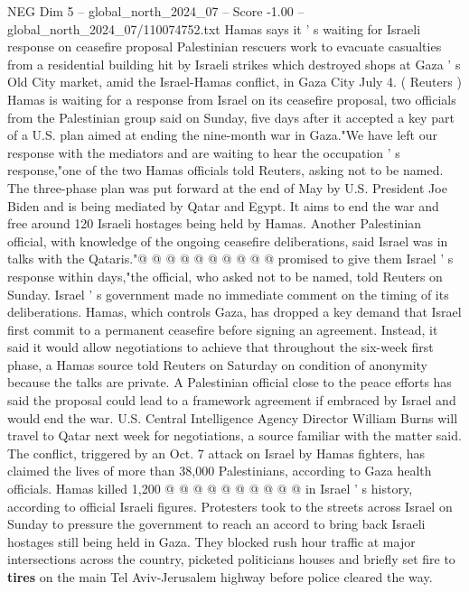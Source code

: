 \begin{textsample}{NEG Dim 5 – global\_north\_2024\_07 – Score -1.00 – global\_north\_2024\_07/110074752.txt}  \label{ex:f5_neg_156}
Hamas says it ' s waiting for Israeli response on ceasefire proposal Palestinian rescuers work to evacuate casualties from a residential building hit by Israeli strikes which destroyed shops at Gaza ' s Old City market, amid the Israel-Hamas conflict, in Gaza City July 4. ( Reuters ) Hamas is waiting for a response from Israel on its ceasefire proposal, two officials from the Palestinian group said on Sunday, five days after it accepted a key part of a U.S. plan aimed at ending the nine-month war in Gaza."We have left our response with the mediators and are waiting to hear the occupation ' s response,"one of the two Hamas officials told Reuters, asking not to be named.
The three-phase plan was put forward at the end of May by U.S.
President Joe Biden and is being mediated by Qatar and Egypt.
It aims to end the war and free around 120 Israeli hostages being held by Hamas.
Another Palestinian official, with knowledge of the ongoing ceasefire deliberations, said Israel was in talks with the Qataris."@ @ @ @ @ @ @ @ @ @ promised to give them Israel ' s response within days,"the official, who asked not to be named, told Reuters on Sunday.
Israel ' s government made no immediate comment on the timing of its deliberations.
Hamas, which controls Gaza, has dropped a key demand that Israel first commit to a permanent ceasefire before signing an agreement.
Instead, it said it would allow negotiations to achieve that throughout the six-week first phase, a Hamas source told Reuters on Saturday on condition of anonymity because the talks are private.
A Palestinian official close to the peace efforts has said the proposal could lead to a framework agreement if embraced by Israel and would end the war.
U.S.
Central Intelligence Agency Director William Burns will travel to Qatar next week for negotiations, a source familiar with the matter said.
The conflict, triggered by an Oct. 7 attack on Israel by Hamas fighters, has claimed the lives of more than 38,000 Palestinians, according to Gaza health officials.
Hamas killed 1,200 @ @ @ @ @ @ @ @ @ @ in Israel ' s history, according to official Israeli figures.
Protesters took to the streets across Israel on Sunday to pressure the government to reach an accord to bring back Israeli hostages still being held in Gaza.
They blocked rush hour traffic at major intersections across the country, picketed politicians houses and briefly set fire to \textbf{tires} on the main Tel Aviv-Jerusalem highway before police cleared the way.

\end{textsample}
